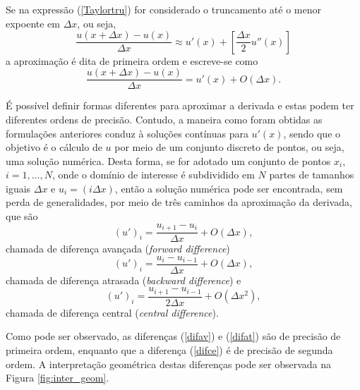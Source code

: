 Se na expressão (\ref{Taylortru}) for considerado o truncamento até o menor expoente em $ \Delta x$, ou seja,
\begin{equation} \label{Taylor_1}
\frac{ u( x + \Delta x) - u(x)}{ \Delta x} \approx u'(x) + \left[ \frac{ \Delta x}{2} u''(x) \right]
\end{equation}
a aproximação é dita de primeira ordem e escreve-se como
\begin{equation} \label{ordem_1}
\frac{ u( x + \Delta x) - u(x)}{ \Delta x} = u'(x) + O( \Delta x).
\end{equation}

É possível definir formas diferentes para aproximar a derivada e estas podem ter diferentes ordens de precisão. Contudo, a maneira como foram obtidas as formulações anteriores conduz à soluções contínuas para $u'(x)$, sendo que o objetivo é o cálculo de $u$ por meio de um conjunto discreto de pontos, ou seja, uma solução numérica. Desta forma, se for adotado um conjunto de pontos $x_i$, $i = 1, \ldots, N$, onde o domínio de interesse é subdividido em $N$ partes de tamanhos iguais $ \Delta x$ e $ u_i = ( i \Delta x)$, então a solução numérica pode ser encontrada, sem perda de generalidades, por meio de três caminhos da aproximação da derivada, que são
\begin{equation} \label{difav}
( u')_i = \frac{ u_{i+1} - u_i}{ \Delta x} + O( \Delta x),
\end{equation}
chamada de diferença avançada (\textit{forward difference})
\begin{equation} \label{difat}
( u')_i = \frac{ u_{i} - u_{i-1}}{ \Delta x} + O( \Delta x),
\end{equation}
chamada de diferença atrasada (\textit{backward difference}) e
\begin{equation} \label{difce}
( u')_i = \frac{ u_{i+1} - u_{i-1}}{2 \Delta x} + O( \Delta x^2),
\end{equation}
chamada de diferença central (\textit{central difference}).

Como pode ser observado, as diferenças (\ref{difav}) e (\ref{difat}) são de precisão de primeira ordem, enquanto que a diferença (\ref{difce}) é de precisão de segunda ordem. A interpretação geométrica destas diferenças pode ser observada na Figura \ref{fig:inter_geom}.

